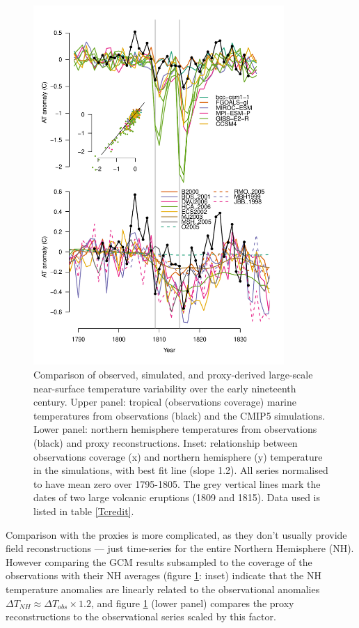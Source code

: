 \documentclass[CP]{copernicus}
\begin{document}
\begin{figure}[!hbp]
\begin{center}
\includegraphics[angle=0, width=0.85\textwidth]{../../../analysis/anomaly_ts/compare_at_anom_multiplex}
\caption{Comparison of observed, simulated, and proxy-derived large-scale near-surface temperature variability over the early nineteenth century. Upper panel: tropical (observations coverage) marine temperatures from observations (black) and the CMIP5 simulations. Lower panel: northern hemisphere temperatures from observations (black) and proxy reconstructions. Inset: relationship between observations coverage (x) and northern hemisphere (y) temperature in the simulations, with best fit line (slope 1.2). All series normalised to have mean zero over 1795-1805. The grey vertical lines mark the dates of two large volcanic eruptions (1809 and 1815). Data used is listed in table \ref{Tcredit}.}
\label{Fconst1}
\end{center}
\end{figure}

Comparison with the proxies is more complicated, as they don't usually provide field reconstructions --- just time-series for the entire Northern Hemisphere (NH). However comparing the GCM results subsampled to the coverage of the observations with their NH averages (figure \ref{Fconst1}: inset) indicate that the NH temperature anomalies are linearly related to the observational anomalies $\Delta T_{NH} \approx \Delta T_{obs}\times 1.2$, and figure \ref{Fconst1} (lower panel) compares the proxy reconstructions to the observational series scaled by this factor. 
\end{document}

